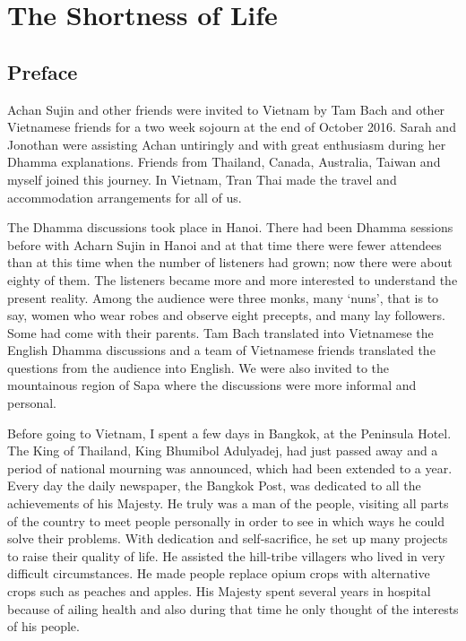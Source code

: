 \part{The Shortness of Life} 

\chapter{Preface} 

Achan Sujin and other friends were invited to Vietnam by Tam Bach and other 
Vietnamese friends for a two week sojourn at the end of October 2016. Sarah 
and Jonothan were assisting Achan untiringly and with great enthusiasm during 
her Dhamma explanations. Friends from Thailand, Canada, Australia, Taiwan 
and myself joined this journey. In Vietnam, Tran Thai made the travel and accommodation arrangements for all of us. 

The Dhamma discussions took place in Hanoi. There had been Dhamma sessions before with Acharn Sujin in Hanoi and at that time there were fewer attendees than at this time when the number of listeners had grown; now there 
were about eighty of them. The listeners became more and more interested to 
understand the present reality. Among the audience were three monks, many 
`nuns', that is to say, women who wear robes and observe eight precepts, and 
many lay followers. Some had come with their parents. Tam Bach translated into Vietnamese the English Dhamma discussions and a team of Vietnamese 
friends translated the questions from the audience into English. We were also 
invited to the mountainous region of Sapa where the discussions were more informal and personal. 

Before going to Vietnam, I spent a few days in Bangkok, at the Peninsula Hotel. 
The King of Thailand, King Bhumibol Adulyadej, had just passed away and a 
period of national mourning was announced, which had been extended to a year. 
Every day the daily newspaper, the Bangkok Post, was dedicated to all the 
achievements of his Majesty. He truly was a man of the people, visiting all parts 
of the country to meet people personally in order to see in which ways he could 
solve their problems. With dedication and self-sacrifice, he set up many projects 
to raise their quality of life. He assisted the hill-tribe villagers who lived in very 
difficult circumstances. He made people replace opium crops with alternative 
crops such as peaches and apples. His Majesty spent several years in hospital 
because of ailing health and also during that time he only thought of the interests of his people. 

